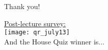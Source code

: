 \documentclass[aspectratio=169]{beamer}
\begin{document}
\begin{frame}[plain]
	\begin{center} Thank you! \end{center}

	\begin{center}
    {\color{blue} \href{https://docs.google.com/forms/d/e/1FAIpQLSeuWVRsHKsKLdm0YIQBSbxIhdp4lozuzs90zZfY0QKmrJDPtA/viewform?usp=sf_link}{Post-lecture survey:}} \\
    \vspace{5pt}
    \texttt{[image: qr\_july13]} \\
    \vspace{5pt}
    And the House Quiz winner is...
  \end{center}
\end{frame}
\end{document}
